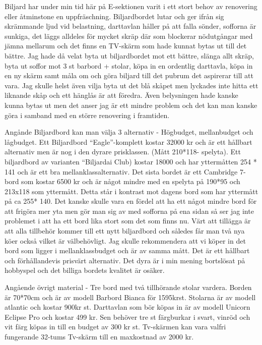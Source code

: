 \documentclass[../_main/handlingar.tex]{subfiles}
\begin{document}

Biljard har under min tid här på E-sektionen varit i ett stort behov av renovering eller
åtminstone en uppfräschning. Biljardbordet lutar och ger ifrån sig skrämmande ljud vid
belastning, darttavlan håller på att falla sönder, sofforna är sunkiga, det läggs alldeles för
mycket skräp där som blockerar nödutgångar med jämna mellarum och det finns en
TV-skärm som hade kunnat bytas ut till det bättre. Jag hade då velat byta ut biljardbordet
mot ett bättre, slänga allt skräp, byta ut soffor mot 3 st barbord + stolar, köpa in en ordentlig
darttavla, köpa in en ny skärm samt måla om och göra biljard till det pubrum det aspirerar till
att vara. Jag skulle helst även vilja byta ut det blå skåpet men lyckades inte hitta ett liknande
skåp och ett hänglås är att föredra. Även belysningen hade kanske kunna bytas ut men det
anser jag är ett mindre problem och det kan man kanske göra i samband med en större
renovering i framtiden.

Angånde Biljardbord kan man välja 3 alternativ - Högbudget, mellanbudget och lågbudget.
Ett Biljardbord “Eagle”-komplett kostar 32000 kr och är ett hållbart alternativ men är nog i
den dyrare prisklassen. (Mått 210*118- spelyta). Ett biljardbord av varianten “Biljardai Club)
kostar 18000 och har yttermåtten 254 * 141 och är ett bra mellanklassalternativ. Det sista
bordet är ett Cambridge 7-bord som kostar 6500 kr och är något mindre med en spelyta på
190*95 och 213x118 som yttermått. Detta står i kontrast mot dagens bord som har yttermått
på ca 255* 140. Det kanske skulle vara en fördel att ha ett något mindre bord för att frigöra
mer yta men gör man sig av med sofforna på ena sidan så ser jag inte problemet i att ha ett
bord lika stort som det som finns nu. Värt att tillägga är att alla tillbehör kommer till ett nytt
biljardbord och således får man två nya köer också vilket är välbehövligt. Jag skulle
rekommendera att vi köper in det bord som ligger i mellanklassbudget och är av samma
mått. Det är ett hållbart och förhållandevis prisvärt alternativ. Det dyra är i min mening
bortslösat på hobbyspel och det billiga bordets kvalitet är osäker.

Angående övrigt material - Tre bord med två tillhörande stolar vardera. Borden är 70*70cm
och är av modell Barbord Bianca för 1595krst. Stolarna är av modell atlantic och kostar
900kr st. Darttavlan som bör köpas in är av modell Unicorn Eclipse Pro och kostar 499 kr.
Sen behöver tre st färgburkar i svart, vinröd och vit färg köpas in till en budget av 300 kr st.
Tv-skärmen kan vara valfri fungerande 32-tums Tv-skärm till en maxkostnad av 2000 kr.
\end{document}
